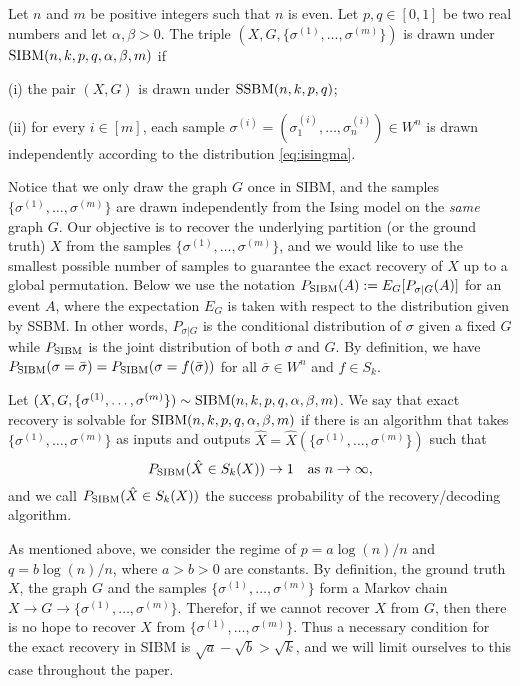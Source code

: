 \documentclass{article}
\begin{document}
\begin{definition}
Let $n$ and $m$ be positive integers such that $n$ is even. Let $p,q\in[0,1]$ be two real numbers and let $\alpha,\beta>0$. The triple $(X,G,\{\sigma^{(1)},\dots,\sigma^{(m)}\})$ is drawn under $\operatorname{SIBM}(n,k, p,q,\alpha,\beta,m)$ if

\noindent
(i) the pair $(X,G)$ is drawn under $\operatorname{SSBM}(n,k, p,q)$;

\noindent
(ii) for every $i\in[m]$, each sample $\sigma^{(i)}=(\sigma_1^{(i)},\dots,\sigma_n^{(i)}) \in W^n$ is drawn independently according to the distribution \eqref{eq:isingma}.
\end{definition}

Notice that we only draw the graph $G$ once in SIBM, and the samples $\{\sigma^{(1)},\dots,\sigma^{(m)}\}$ are drawn independently from the Ising model on the {\em same} graph $G$.
Our objective is to recover the underlying partition (or the ground truth) $X$ from the samples $\{\sigma^{(1)},\dots,\sigma^{(m)}\}$, and we would like to use the smallest possible number of samples to guarantee the exact recovery of $X$ up to a global permutation.
Below we use the notation $P_{\operatorname{SIBM}}(A):=E_G[P_{\sigma|G}(A)]$ for an event $A$, where the expectation $E_G$ is taken with respect to the distribution given by SSBM. In other words, $P_{\sigma|G}$ is the conditional distribution of  $\sigma$ given a fixed $G$ while $P_{\operatorname{SIBM}}$ is the joint distribution of both $\sigma$ and $G$.
By definition, we have $P_{\operatorname{SIBM}}(\sigma=\bar{\sigma})=P_{\operatorname{SIBM}}(\sigma=f(\bar{\sigma}))$ for all $\bar{\sigma}\in W^n$ and $f \in S_k$.

\begin{definition}
Let $(X,G,\{\sigma^{(1)},\dots,\sigma^{(m)}\}) \sim \operatorname{SIBM}(n,k, p,q,\alpha,\beta,m)$.
We say that exact recovery is solvable for $\operatorname{SIBM}(n,k,p,q,\alpha,\beta,m)$ if there is an algorithm that takes $\{\sigma^{(1)},\dots,\sigma^{(m)}\}$ as inputs and outputs $\hat{X}=\hat{X}(\{\sigma^{(1)},\dots,\sigma^{(m)}\})$ such that
$$
P_{\operatorname{SIBM}}(\hat{X} \in S_k(X)) \to 1
\text{~~~as~} n\to\infty ,
$$
and we call $P_{\operatorname{SIBM}}(\hat{X} \in S_k(X))$ the success probability of the recovery/decoding algorithm.
\end{definition}


As mentioned above, we consider the regime of $p=a\log(n)/n$ and $q=b\log(n)/n$, where $a>b> 0$ are constants. By definition, the ground truth $X$, the graph $G$ and the samples $\{\sigma^{(1)},\dots,\sigma^{(m)}\}$ form a Markov chain $X\to G\to \{\sigma^{(1)},\dots,\sigma^{(m)}\}$. Therefor, if we cannot recover $X$ from $G$, then there is no hope to recover $X$ from $\{\sigma^{(1)},\dots,\sigma^{(m)}\}$. Thus a necessary condition for the exact recovery in SIBM is $\sqrt{a}-\sqrt{b}> \sqrt{k}$, and we will limit ourselves to this case throughout the paper.
\end{document}
